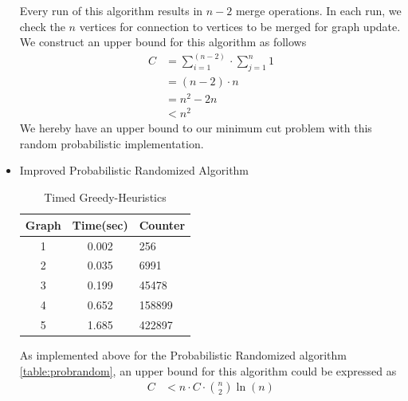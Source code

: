 \documentclass[longpaper, english, final, times]{revdetua}
\begin{document}
\begin{itemize}
					Every run of this algorithm results in $n-2$ merge operations. In each run, we check the $n$ vertices for connection to vertices to be merged for graph update. We construct an upper bound for this algorithm as follows 
					\begin{align*}
						C&=\sum_{i=1}^{(n-2)}\cdot \sum_{j=1}^{n} 1 \\
						&=(n-2)\cdot n\\
						&=n^2-2n \\
						&<n^2
					\end{align*}
					We hereby have an upper bound to our minimum cut problem with this random probabilistic implementation.
					
				\item Improved Probabilistic Randomized Algorithm \\
					\begin{table}[h]
						\caption{Timed Greedy-Heuristics}
						\label{table:impprobrandom}
						\begin{center}					
							{\renewcommand{\arraystretch}{2}
								\begin{tabular}{|c|c|l|}
									\hline
									Graph& Time(sec) & Counter\\
									\hline
									1&0.002&256\\
									2&0.035&6991\\
									3&0.199&45478\\
									4&0.652&158899\\
									5&1.685&422897\\
									\hline
								\end{tabular}
							}
						\end{center}
					\end{table}
					
					As implemented above for the Probabilistic Randomized algorithm \ref{table:probrandom}, an upper bound for this algorithm could be expressed as
					\begin{align*}
						C&< n\cdot C \cdot {n\choose 2} \ln (n)\\
					\end{align*}
			\end{itemize}
			
			
\end{document}
